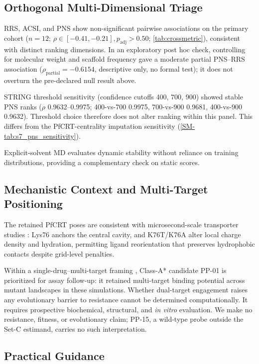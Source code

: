 \documentclass[journal=jcisd8,manuscript=article,layout=traditional]{achemso}
\begin{document}
\subsection{Orthogonal Multi-Dimensional Triage}

RRS, ACSI, and PNS show non-significant pairwise associations on the primary cohort ($n=\num{12}$; $\rho \in [-0.41, -0.21], p_{\text{adj}} > 0.50$; \cref{tab:crossmetric}), consistent with distinct ranking dimensions. In an exploratory post hoc check, controlling for molecular weight and scaffold frequency gave a moderate partial PNS--RRS association ($\rho_{\mathrm{partial}} = -0.6154$, descriptive only, no formal test); it does not overturn the pre-declared null result above.

STRING threshold sensitivity (confidence cutoffs 400, 700, 900) showed stable PNS ranks ($\rho$ \numrange{0.9632}{0.9975}; 400-vs-700 \num{0.9975}, 700-vs-900 \num{0.9681}, 400-vs-900 \num{0.9632}). Threshold choice therefore does not alter ranking within this panel. This differs from the PfCRT-centrality imputation sensitivity (\cref{SM-tab:s7_pns_sensitivity}).

Explicit-solvent MD evaluates dynamic stability without reliance on training distributions, providing a complementary check on static scores.

\subsection{Mechanistic Context and Multi-Target Positioning}

The retained PfCRT poses are consistent with microsecond-scale transporter studies \citep{tanner2025pfcrt}: Lys76 anchors the central cavity, and K76T/K76A alter local charge density and hydration, permitting ligand reorientation that preserves hydrophobic contacts despite grid-level penalties.

Within a single-drug--multi-target framing \citep{polypharmacology_malaria_2026}, Class-A* candidate PP-01 is prioritized for assay follow-up: it retained multi-target binding potential across mutant landscapes in these simulations. Whether dual-target engagement raises any evolutionary barrier to resistance cannot be determined computationally. It requires prospective biochemical, structural, and \textit{in vitro} evaluation. We make no resistance, fitness, or evolutionary claim; PP-15, a wild-type probe outside the Set-C estimand, carries no such interpretation.

\subsection{Practical Guidance}
\end{document}
